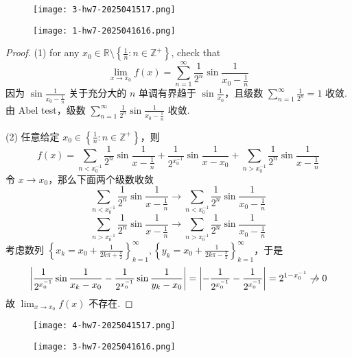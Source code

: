 \begin{exercise}
\begin{figure}[H]
\centering
\texttt{[image: 3-hw7-2025041517.png]}
\label{}
\end{figure}
\end{exercise}
\begin{figure}[H]
\centering
\texttt{[image: 1-hw7-2025041616.png]}
\label{}
\end{figure}

\begin{proof}
(1) for any $x_0\in \mathbb{R}\setminus \left\{  \frac{1}{n}:n\in \mathbb{Z}^{+}  \right\}$, check that
\[
\lim_{ x \to x_0 } f(x)=\sum_{n=1}^{\infty} \frac{1}{2^{n}}\sin\frac{1}{x_0-\frac{1}{n}}
\]
因为 $\sin\frac{1}{x_0-\frac{1}{n}}$ 关于充分大的 $n$ 单调有界趋于 $\sin\frac{1}{x_0}$，且级数 $\sum_{n=1}^{\infty}\frac{1}{2^{n}}=1$ 收敛. 由 Abel test，级数 $\sum_{n=1}^{\infty}\frac{1}{2^{n}}\sin\frac{1}{x_0-\frac{1}{n}}$ 收敛.

(2) 任意给定 $x_0\in \left\{  \frac{1}{n}:n\in \mathbb{Z}^{+}  \right\}$，则
\[
f(x)=\sum_{n<x_0 ^{-1}}\frac{1}{2^{n}}\sin\frac{1}{x-\frac{1}{n}}+\frac{1}{2^{x_0^{-1}}}\sin\frac{1}{x-x_0}+\sum_{n>x_0 ^{-1}}\frac{1}{2^{n}}\sin\frac{1}{x-\frac{1}{n}}
\]
令 $x\to x_0$，那么下面两个级数收敛
\[
\sum_{n<x_0 ^{-1}}\frac{1}{2^{n}}\sin\frac{1}{x-\frac{1}{n}}\to \sum_{n<x_0 ^{-1}}\frac{1}{2^{n}}\sin\frac{1}{x_0-\frac{1}{n}}
\]
\[
\sum_{n>x_0 ^{-1}}\frac{1}{2^{n}}\sin\frac{1}{x-\frac{1}{n}}\to \sum_{n>x_0 ^{-1}}\frac{1}{2^{n}}\sin\frac{1}{x_0-\frac{1}{n}}
\]
考虑数列 $\left\{  x_k=x_0+\frac{1}{2k\pi+\frac{\pi}{2}}  \right\}_{k=1}^{\infty},\left\{  y_k=x_0+\frac{1}{2k\pi-\frac{\pi}{2}}  \right\}_{k=1}^{\infty}$，于是
\[
\left\lvert  \frac{1}{2^{x_0 ^{-1}}}\sin\frac{1}{x_k-x_0}-\frac{1}{2^{x_0 ^{-1}}}\sin\frac{1}{y_k-x_0}  \right\rvert =\left\lvert  -\frac{1}{2^{x_0 ^{-1}}}-\frac{1}{2^{x_0 ^{-1}}}  \right\rvert =2^{1-x_0 ^{-1}}\centernot{\to}0
\]
故 $\lim_{ x \to x_0 }f(x)$ 不存在.

\end{proof}

\begin{exercise}
\begin{figure}[H]
\centering
\texttt{[image: 4-hw7-2025041517.png]}
\label{}
\end{figure}
\end{exercise}
\begin{figure}[H]
\centering
\texttt{[image: 3-hw7-2025041616.png]}
\label{}
\end{figure}

